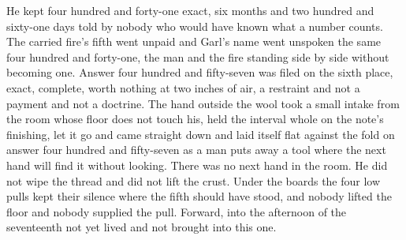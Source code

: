 He kept four hundred and forty-one exact, six months and two hundred and sixty-one days told by nobody who would have known what a number counts. The carried fire's fifth went unpaid and Garl's name went unspoken the same four hundred and forty-one, the man and the fire standing side by side without becoming one. Answer four hundred and fifty-seven was filed on the sixth place, exact, complete, worth nothing at two inches of air, a restraint and not a payment and not a doctrine. The hand outside the wool took a small intake from the room whose floor does not touch his, held the interval whole on the note's finishing, let it go and came straight down and laid itself flat against the fold on answer four hundred and fifty-seven as a man puts away a tool where the next hand will find it without looking. There was no next hand in the room. He did not wipe the thread and did not lift the crust. Under the boards the four low pulls kept their silence where the fifth should have stood, and nobody lifted the floor and nobody supplied the pull. Forward, into the afternoon of the seventeenth not yet lived and not brought into this one.
